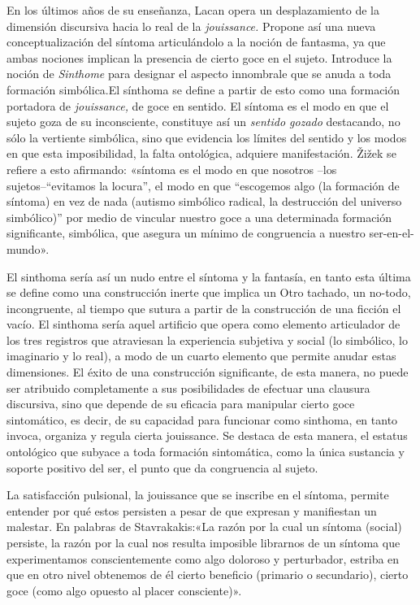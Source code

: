 En los últimos años de su enseñanza, Lacan opera un desplazamiento de la dimensión discursiva hacia lo real de la \emph{jouissance. }Propone así una nueva conceptualización del síntoma articulándolo a la noción de fantasma, ya que ambas nociones implican la presencia de cierto goce en el sujeto. Introduce la noción de \emph{Sinthome} para designar el aspecto innombrale que se anuda a toda formación simbólica.El sínthoma se define a partir de esto como una formación portadora de \emph{jouissance,} de goce en sentido. El síntoma es el modo en que el sujeto goza de su inconsciente, constituye así un \emph{sentido gozado} destacando, no sólo la vertiente simbólica, sino que evidencia los límites del sentido y los modos en que esta imposibilidad, la falta ontológica, adquiere manifestación. Žižek se refiere a esto afirmando: «síntoma es el modo en que nosotros --los sujetos--``evitamos la locura'', el modo en que ``escogemos algo (la formación de síntoma) en vez de nada (autismo simbólico radical, la destrucción del universo simbólico)'' por medio de vincular nuestro goce a una determinada formación significante, simbólica, que asegura un mínimo de congruencia a nuestro ser-en-el-mundo».

El sinthoma sería así un nudo entre el síntoma y la fantasía, en tanto esta última se define como una construcción inerte que implica un Otro tachado, un no-todo, incongruente, al tiempo que sutura a partir de la construcción de una ficción el vacío. El sinthoma sería aquel artificio que opera como elemento articulador de los tres registros que atraviesan la experiencia subjetiva y social (lo simbólico, lo imaginario y lo real), a modo de un cuarto elemento que permite anudar estas dimensiones. El éxito de una construcción significante, de esta manera, no puede ser atribuido completamente a sus posibilidades de efectuar una clausura discursiva, sino que depende de su eficacia para manipular cierto goce sintomático, es decir, de su capacidad para funcionar como sinthoma, en tanto invoca, organiza y regula cierta jouissance. Se destaca de esta manera, el estatus ontológico que subyace a toda formación sintomática, como la única sustancia y soporte positivo del ser, el punto que da congruencia al sujeto.

La satisfacción pulsional, la jouissance que se inscribe en el síntoma, permite entender por qué estos persisten a pesar de que expresan y manifiestan un malestar. En palabras de Stavrakakis:«La razón por la cual un síntoma (social) persiste, la razón por la cual nos resulta imposible librarnos de un síntoma que experimentamos conscientemente como algo doloroso y perturbador, estriba en que en otro nivel obtenemos de él cierto beneficio (primario o secundario), cierto goce (como algo opuesto al placer consciente)».

